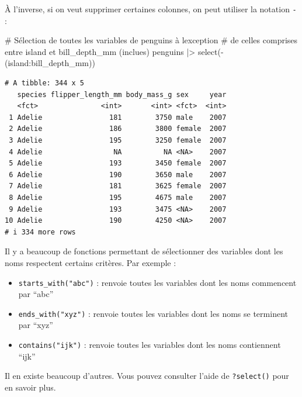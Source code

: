 \documentclass[
  a4paper,
  DIV=11,
  numbers=noendperiod,
  oneside]{scrreprt}
\newenvironment{Shaded}{}{}
\newcommand{\CommentTok}[1]{\textcolor[rgb]{0.42,0.45,0.49}{#1}}
\newcommand{\FunctionTok}[1]{\textcolor[rgb]{0.44,0.26,0.76}{#1}}
\newcommand{\NormalTok}[1]{\textcolor[rgb]{0.14,0.16,0.18}{#1}}
\newcommand{\SpecialCharTok}[1]{\textcolor[rgb]{0.00,0.36,0.77}{#1}}
\providecommand{\tightlist}{%
  \setlength{\itemsep}{0pt}\setlength{\parskip}{0pt}}\usepackage{longtable,booktabs,array}
\begin{document}
À l'inverse, si on veut supprimer certaines colonnes, on peut utiliser
la notation \texttt{-} :

\begin{Shaded}
\begin{Highlighting}[]
\CommentTok{\# Sélection de toutes les variables de \textasciigrave{}penguins\textasciigrave{} à l\textquotesingle{}exception}
\CommentTok{\# de celles comprises entre \textasciigrave{}island\textasciigrave{} et \textasciigrave{}bill\_depth\_mm\textasciigrave{} (inclues)}
\NormalTok{penguins }\SpecialCharTok{|\textgreater{}}
  \FunctionTok{select}\NormalTok{(}\SpecialCharTok{{-}}\NormalTok{(island}\SpecialCharTok{:}\NormalTok{bill\_depth\_mm))}
\end{Highlighting}
\end{Shaded}

\begin{verbatim}
# A tibble: 344 x 5
   species flipper_length_mm body_mass_g sex     year
   <fct>               <int>       <int> <fct>  <int>
 1 Adelie                181        3750 male    2007
 2 Adelie                186        3800 female  2007
 3 Adelie                195        3250 female  2007
 4 Adelie                 NA          NA <NA>    2007
 5 Adelie                193        3450 female  2007
 6 Adelie                190        3650 male    2007
 7 Adelie                181        3625 female  2007
 8 Adelie                195        4675 male    2007
 9 Adelie                193        3475 <NA>    2007
10 Adelie                190        4250 <NA>    2007
# i 334 more rows
\end{verbatim}

Il y a beaucoup de fonctions permettant de sélectionner des variables
dont les noms respectent certains critères. Par exemple :

\begin{itemize}
\tightlist
\item
  \texttt{starts\_with("abc")} : renvoie toutes les variables dont les
  noms commencent par ``abc''
\item
  \texttt{ends\_with("xyz")} : renvoie toutes les variables dont les
  noms se terminent par ``xyz''
\item
  \texttt{contains("ijk")} : renvoie toutes les variables dont les noms
  contiennent ``ijk''
\end{itemize}

Il en existe beaucoup d'autres. Vous pouvez consulter l'aide de
\texttt{?select()} pour en savoir plus.
\end{document}
